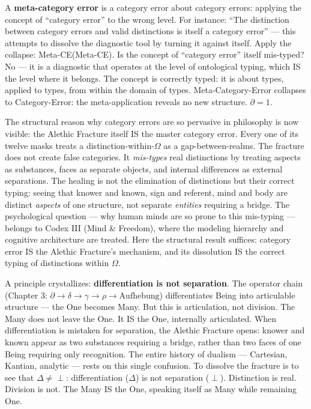 \documentclass[10pt, openany, oneside]{book}
\begin{document}
A \textbf{meta-category error} is a category error about category errors: applying the concept of ``category error'' to the wrong level. For instance: ``The distinction between category errors and valid distinctions is itself a category error'' --- this attempts to dissolve the diagnostic tool by turning it against itself. Apply the collapse: Meta-CE(Meta-CE). Is the concept of ``category error'' itself mis-typed? No --- it is a diagnostic that operates at the level of ontological typing, which IS the level where it belongs. The concept is correctly typed: it is about types, applied to types, from within the domain of types. Meta-Category-Error collapses to Category-Error: the meta-application reveals no new structure. $\partial = 1$.

The structural reason why category errors are so pervasive in philosophy is now visible: the Alethic Fracture itself IS the master category error. Every one of its twelve masks treats a distinction-within-$\Omega$ as a gap-between-realms. The fracture does not create false categories. It \textit{mis-types} real distinctions by treating aspects as substances, faces as separate objects, and internal differences as external separations. The healing is not the elimination of distinctions but their correct typing: seeing that knower and known, sign and referent, mind and body are distinct \textit{aspects} of one structure, not separate \textit{entities} requiring a bridge. The psychological question --- why human minds are so prone to this mis-typing --- belongs to Codex III (Mind \& Freedom), where the modeling hierarchy and cognitive architecture are treated. Here the structural result suffices: category error IS the Alethic Fracture's mechanism, and its dissolution IS the correct typing of distinctions within $\Omega$.

A principle crystallizes: \textbf{differentiation is not separation}. The operator chain (Chapter 3: $\partial \to \delta \to \gamma \to \rho \to \text{Aufhebung}$) differentiates Being into articulable structure --- the One becomes Many. But this is articulation, not division. The Many does not leave the One. It IS the One, internally articulated. When differentiation is mistaken for separation, the Alethic Fracture opens: knower and known appear as two substances requiring a bridge, rather than two faces of one Being requiring only recognition. The entire history of dualism --- Cartesian, Kantian, analytic --- rests on this single confusion. To dissolve the fracture is to see that $\Delta \neq \perp$: differentiation ($\Delta$) is not separation ($\perp$). Distinction is real. Division is not. The Many IS the One, speaking itself as Many while remaining One.
\end{document}
